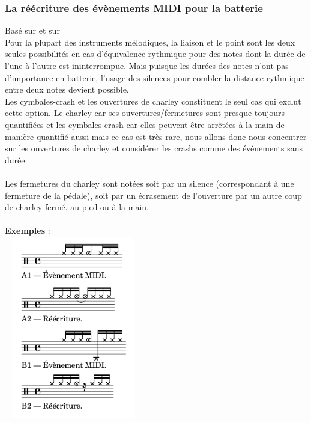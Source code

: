\subsubsection*{La réécriture des évènements MIDI pour la batterie}
Basé sur \cite{jacquemard:hal-01134096} et sur \cite{jacquemard:hal-01403982}\\
Pour la plupart des instruments mélodiques, la liaison et le point sont les deux seules possibilités en cas d’équivalence rythmique pour des notes dont la durée de l’une à l’autre est ininterrompue. Mais puisque les durées des notes n’ont pas d’importance en batterie, l’usage des silences pour combler la distance rythmique entre deux notes devient possible.\\Les cymbales-crash et les ouvertures de charley constituent le seul cas qui exclut cette option. Le charley car ses ouvertures/fermetures sont presque toujours quantifiées et les cymbales-crash car elles peuvent être arrêtées à la main de manière quantifié aussi mais ce cas est très rare, nous allons donc nous concentrer sur les ouvertures de charley et considérer les crashs comme des événements sans durée.\\\\
Les fermetures du charley sont notées soit par un silence (correspondant à une fermeture de la pédale), soit par un écrasement de l’ouverture par un autre coup de charley fermé, au pied ou à la main.\\\\
\textbf{Exemples} :\\
\includegraphics[height=80mm, width=60mm]{images/notation/reecriture/exemples_charley_1.png}\\\\

